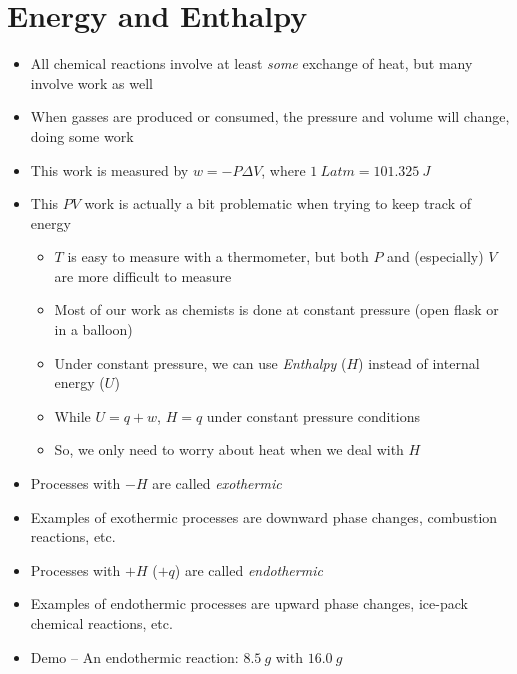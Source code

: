 \documentclass[12pt, openany, letterpaper]{memoir}
\begin{document}
\section{Energy and Enthalpy}
\begin{itemize}
	\item All chemical reactions involve at least \emph{some} exchange of heat, but many involve work as well
	\item When gasses are produced or consumed, the pressure and volume will change, doing some work
	\item This work is measured by $w=-P\Delta V$, where $1~Latm=101.325~J$
	\item This $PV$ work is actually a bit problematic when trying to keep track of energy
	      \begin{itemize}
		      \item $T$ is easy to measure with a thermometer, but both $P$ and (especially) $V$ are more difficult to measure
		      \item Most of our work as chemists is done at constant pressure (open flask or in a balloon)
		      \item Under constant pressure, we can use \emph{Enthalpy} ($H$) instead of internal energy ($U$)
		      \item While $U=q+w$, $H=q$ under constant pressure conditions
		      \item So, we only need to worry about heat when we deal with $H$
	      \end{itemize}
	\item Processes with $-H$ are called \emph{exothermic}
	\item Examples of exothermic processes are downward phase changes, combustion reactions, etc.
	\item Processes with $+H$ ($+q$) are called \emph{endothermic}
	\item Examples of endothermic processes are upward phase changes, ice-pack chemical reactions, etc.
	\item Demo -- An endothermic reaction: $8.5~g$  with $16.0~g$ 
\end{itemize}
\end{document}
